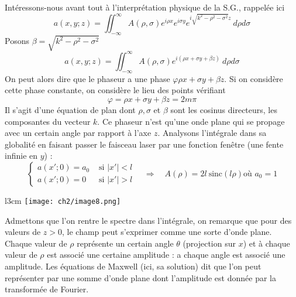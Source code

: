 Intéressons-nous avant tout à l'interprétation physique de la S.G., rappelée ici
\begin{equation}
a(x,y;z) = \iint_{-\infty}^\infty A(\rho,\sigma)e^{i\rho x}e^{i\sigma y} e^{i\sqrt{k^2-\rho^2-
\sigma^2}z}\ d\rho d\sigma
\end{equation}
Posons $\beta = \sqrt{k^2-\rho^2-\sigma^2}$
\begin{equation}
a(x,y;z) = \iint_{-\infty}^\infty A(\rho,\sigma)e^{i(\rho x + \sigma y + \beta z)}\ d\rho d\sigma
\end{equation}
On peut alors dire que le phaseur a une phase $\varphi \rho x + \sigma y + \beta z$. Si on considère 
cette phase constante, on considère le lieu des points vérifiant 
\begin{equation}
\varphi = \rho x + \sigma y + \beta z = 2m\pi
\end{equation}
Il s'agit d'une équation de plan dont $\rho,\sigma$ et $\beta$ sont les cosinus directeurs, les 
composantes du vecteur $k$. Ce phaseur n'est qu'une onde plane qui se propage avec un certain 
angle par rapport à l'axe $z$. Analysons l'intégrale dans sa globalité en faisant passer le 
faisceau laser par une fonction fenêtre (une fente infinie en $y$) :
\begin{equation}
\left\{\begin{array}{ll}
a(x';0) = a_0 & \text{ si } |x'| < l\\
a(x';0) = 0 & \text{ si } |x'| > l
\end{array}\right.\quad \Rightarrow\quad A(\rho) = 2l\ \text{sinc}(l\rho) \text{où $a_0 = 1$}
\end{equation}


\begin{wrapfigure}[7]{l}{3cm}
\vspace{-4mm}
\texttt{[image: ch2/image8.png]}
\end{wrapfigure}
Admettons que l'on rentre le spectre dans l'intégrale, on remarque que pour des valeurs de $z>0$, 
le champ peut s'exprimer comme une sorte d'onde plane. Chaque valeur de $\rho$ représente un certain 
angle $\theta$ (projection sur $x$) et à chaque valeur de $\rho$ est associé une certaine amplitude : 
a chaque angle est associé une amplitude. Les équations de Maxwell (ici, sa solution) dit que l'on 
peut représenter par une somme d'onde plane dont l'amplitude est donnée par la transformée de 
Fourier.\\

